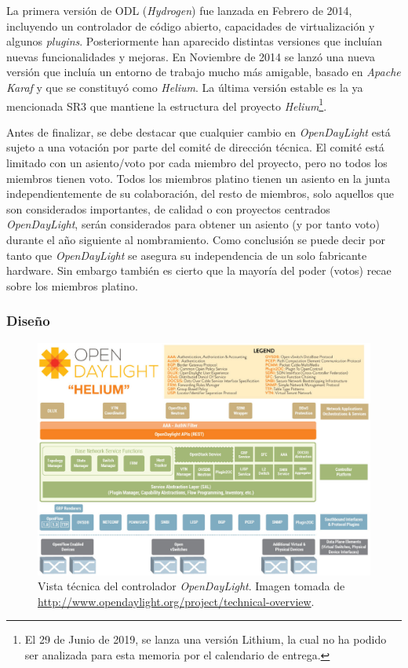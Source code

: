 \documentclass[a4paper,11pt]{book}
\begin{document}
La primera versión de \ac{ODL} (\textit{Hydrogen}) fue lanzada en Febrero de 2014, incluyendo un controlador de código abierto, capacidades de virtualización y algunos \textit{plugins}. Posteriormente han aparecido distintas versiones que incluían nuevas funcionalidades y mejoras. En Noviembre de 2014 se lanzó una nueva versión que incluía un entorno de trabajo mucho más amigable, basado en \textit{Apache Karaf} y que se constituyó como \textit{Helium}. La última versión estable es la ya mencionada SR3 que mantiene la estructura del proyecto \textit{Helium}\footnote{El 29 de Junio de 2019, se lanza una versión Lithium, la cual no ha podido ser analizada para esta memoria por el calendario de entrega.}.

Antes de finalizar, se debe destacar que cualquier cambio en \emph{OpenDayLight} está sujeto a una votación por parte del comité de dirección técnica. El comité está limitado con un asiento/voto por cada miembro del proyecto, pero no todos los miembros tienen voto. Todos los miembros platino tienen un asiento en la junta independientemente de su colaboración, del resto de miembros, solo aquellos que son considerados importantes, de calidad o con proyectos centrados \emph{OpenDayLight}, serán considerados para obtener un asiento (y por tanto voto) durante el año siguiente al nombramiento. Como conclusión se puede decir por tanto que \emph{OpenDayLight} se asegura su independencia de un solo fabricante hardware. Sin embargo también es cierto que la mayoría del poder (votos) recae sobre los miembros platino.

\subsubsection{Diseño}
\begin{figure}[tb]
\centering
\hspace*{-0.5cm}
\includegraphics[scale=0.4]{./figuras/ODLOverview}
\caption[Vista técnica del controlador \emph{OpenDayLight}]{Vista técnica del controlador \emph{OpenDayLight}. Imagen tomada de \url{http://www.opendaylight.org/project/technical-overview}.}\label{ODLOverview}
\end{figure}
\end{document}
